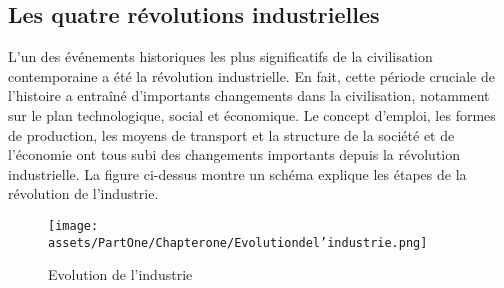 \newpage
\subsection{Les quatre révolutions industrielles}
L'un des événements historiques les plus significatifs de la civilisation contemporaine a été la révolution industrielle. En fait, cette période cruciale de l'histoire a entraîné d'importants changements dans la civilisation, notamment sur le plan technologique, social et économique. Le concept d'emploi, les formes de production, les moyens de transport et la structure de la société et de l'économie ont tous subi des changements importants depuis la révolution industrielle\cite{AlloprofAideAux}. La figure ci-dessus montre un schéma explique les étapes de la révolution de l’industrie.

\begin{figure}[h]
    \centering
    \texttt{[image: assets/PartOne/Chapterone/Evolutiondel'industrie.png]}
    \caption{Evolution de l'industrie}
    \label{Evolutiondel'industrie}
    \end{figure}

